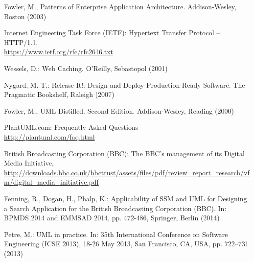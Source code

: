 \documentclass[runningheads,a4paper]{llncs}
\begin{document}
\begin{thebibliography}{}
 Fowler, M., Patterns of Enterprise Application Architecture. Addison-Wesley, Boston (2003)

 Internet Engineering Task Force (IETF): Hypertext Transfer Protocol -- HTTP/1.1,\\
\url{https://www.ietf.org/rfc/rfc2616.txt}

 Wessels, D.: Web Caching. O'Reilly, Sebastopol (2001)

 Nygard, M. T.: Release It!: Design and Deploy Production-Ready Software. The Pragmatic Bookshelf, Raleigh (2007)

 Fowler, M., UML Distilled. Second Edition. Addison-Wesley, Reading (2000)

 PlantUML.com: Frequently Asked Questions\\
\url{http://plantuml.com/faq.html}

 British Broadcasting Corporation (BBC): The BBC's management of its Digital Media Initiative,\\
\url{http://downloads.bbc.co.uk/bbctrust/assets/files/pdf/review_report_research/vfm/digital_media_initiative.pdf}

 Fenning, R., Dogan, H., Phalp, K.: Applicability of SSM and UML for Designing a Search Application for the British Broadcasting Corporation (BBC). In: BPMDS 2014 and EMMSAD 2014, pp. 472-486, Springer, Berlin (2014)

 Petre, M.: UML in practice. In: 35th International Conference on Software Engineering (ICSE 2013), 18-26 May 2013, San Francisco, CA, USA, pp. 722–731 (2013)

\end{thebibliography}
\end{document}
